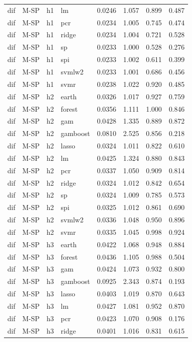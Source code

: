 \begin{ThreePartTable}
\begin{longtable}[t]{llclcccc}
dif & M-SP & h1 & lm & 0.0246 & 1.057 & 0.899 & 0.487\\
dif & M-SP & h1 & pcr & 0.0234 & 1.005 & 0.745 & 0.474\\
dif & M-SP & h1 & ridge & 0.0234 & 1.004 & 0.721 & 0.528\\
dif & M-SP & h1 & sp & 0.0233 & 1.000 & 0.528 & 0.276\\
dif & M-SP & h1 & spi & 0.0233 & 1.002 & 0.611 & 0.399\\
dif & M-SP & h1 & svmlw2 & 0.0233 & 1.001 & 0.686 & 0.456\\
dif & M-SP & h1 & svmr & 0.0238 & 1.022 & 0.920 & 0.485\\
\addlinespace
dif & M-SP & h2 & earth & 0.0326 & 1.017 & 0.927 & 0.759\\
dif & M-SP & h2 & forest & 0.0356 & 1.111 & 1.000 & 0.846\\
dif & M-SP & h2 & gam & 0.0428 & 1.335 & 0.889 & 0.872\\
dif & M-SP & h2 & gamboost & 0.0810 & 2.525 & 0.856 & 0.218\\
dif & M-SP & h2 & lasso & 0.0324 & 1.011 & 0.822 & 0.610\\
dif & M-SP & h2 & lm & 0.0425 & 1.324 & 0.880 & 0.843\\
dif & M-SP & h2 & pcr & 0.0337 & 1.050 & 0.909 & 0.814\\
dif & M-SP & h2 & ridge & 0.0324 & 1.012 & 0.842 & 0.654\\
dif & M-SP & h2 & sp & 0.0324 & 1.009 & 0.785 & 0.573\\
dif & M-SP & h2 & spi & 0.0325 & 1.012 & 0.861 & 0.690\\
dif & M-SP & h2 & svmlw2 & 0.0336 & 1.048 & 0.950 & 0.896\\
dif & M-SP & h2 & svmr & 0.0335 & 1.045 & 0.998 & 0.924\\
\addlinespace
dif & M-SP & h3 & earth & 0.0422 & 1.068 & 0.948 & 0.884\\
dif & M-SP & h3 & forest & 0.0436 & 1.105 & 0.988 & 0.504\\
dif & M-SP & h3 & gam & 0.0424 & 1.073 & 0.932 & 0.800\\
dif & M-SP & h3 & gamboost & 0.0925 & 2.343 & 0.874 & 0.193\\
dif & M-SP & h3 & lasso & 0.0403 & 1.019 & 0.870 & 0.643\\
dif & M-SP & h3 & lm & 0.0427 & 1.081 & 0.952 & 0.870\\
dif & M-SP & h3 & pcr & 0.0423 & 1.070 & 0.908 & 0.176\\
dif & M-SP & h3 & ridge & 0.0401 & 1.016 & 0.831 & 0.615\\

\end{longtable}
\end{ThreePartTable}
